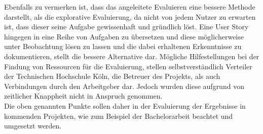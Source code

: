 Ebenfalls zu vermerken ist, dass das angeleitete Evaluieren eine bessere Methode darstellt, als die explorative Evaluierung, da nicht von jedem Nutzer zu erwarten ist, dass dieser seine Aufgabe gewissenhaft und gründlich löst. Eine User Story hingegen in eine Reihe von Aufgaben zu übersetzen und diese möglicherweise unter Beobachtung lösen zu lassen und die dabei erhaltenen Erkenntnisse zu dokumentieren, stellt die bessere Alternative dar. Mögliche Hilfestellungen bei der Findung von Ressourcen für die Evaluierung, stellen selbstverständlich Verteiler der Technischen Hochschule Köln, die Betreuer des Projekts, als auch Verbindungen durch den Arbeitgeber dar. Jedoch wurden diese aufgrund von zeitlicher Knappheit nicht in Anspruch genommen.\\ 
Die oben genannten Punkte sollen daher in der Evaluierung der Ergebnisse in kommenden Projekten, wie zum Beispiel der Bachelorarbeit beachtet und umgesetzt werden.

